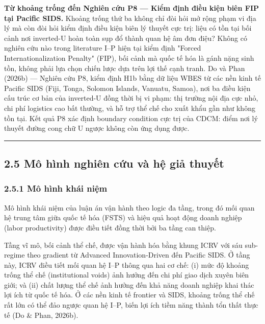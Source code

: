 \documentclass[12pt,a4paper]{article}
\begin{document}
\textbf{Từ khoảng trống đến Nghiên cứu P8 --- Kiểm định điều kiện biên
FIP tại Pacific SIDS.} Khoảng trống thứ ba không chỉ đòi hỏi mở rộng
phạm vi địa lý mà còn đòi hỏi kiểm định điều kiện biên lý thuyết cực
trị: liệu có tồn tại bối cảnh nơi inverted-U hoàn toàn sụp đổ thành quan
hệ âm đơn điệu? Không có nghiên cứu nào trong literature I--P hiện tại
kiểm định "Forced Internationalization Penalty" (FIP), bối cảnh mà quốc
tế hóa là gánh nặng sinh tồn, không phải lựa chọn chiến lược dựa trên
lợi thế cạnh tranh. Do và Phan (2026b) --- Nghiên cứu P8, kiểm định H1b
bằng dữ liệu WBES từ các nền kinh tế Pacific SIDS (Fiji, Tonga, Solomon
Islands, Vanuatu, Samoa), nơi ba điều kiện cấu trúc cơ bản của
inverted-U đồng thời bị vi phạm: thị trường nội địa cực nhỏ, chi phí
logistics cao bất thường, và hỗ trợ thể chế cho xuất khẩu gần như không
tồn tại. Kết quả P8 xác định boundary condition cực trị của CDCM: điểm
nơi lý thuyết đường cong chữ U ngược không còn ứng dụng được.

\begin{center}\rule{0.5\linewidth}{0.5pt}\end{center}

\hypertarget{25-muxf4-huxecnh-nghiuxean-cux1ee9u-vuxe0-hux1ec7-giux1ea3-thuyux1ebft}{%
\subsection{2.5 Mô hình nghiên cứu và hệ giả
thuyết}\label{25-muxf4-huxecnh-nghiuxean-cux1ee9u-vuxe0-hux1ec7-giux1ea3-thuyux1ebft}}

\hypertarget{251-muxf4-huxecnh-khuxe1i-niux1ec7m}{%
\subsubsection{2.5.1 Mô hình khái
niệm}\label{251-muxf4-huxecnh-khuxe1i-niux1ec7m}}

Mô hình khái niệm của luận án vận hành theo logic đa tầng, trong đó mối
quan hệ trung tâm giữa quốc tế hóa (FSTS) và hiệu quả hoạt động doanh
nghiệp (labor productivity) được điều tiết đồng thời bởi ba tầng can
thiệp.

Tầng vĩ mô, bối cảnh thể chế, được vận hành hóa bằng khung ICRV với sáu
sub-regime theo gradient từ Advanced Innovation-Driven đến Pacific SIDS.
Ở tầng này, ICRV điều tiết mối quan hệ I--P thông qua hai cơ chế: (i)
mức độ khoảng trống thể chế (institutional voids) ảnh hưởng đến chi phí
giao dịch xuyên biên giới; và (ii) chất lượng thể chế ảnh hưởng đến khả
năng doanh nghiệp khai thác lợi ích từ quốc tế hóa. Ở các nền kinh tế
frontier và SIDS, khoảng trống thể chế rất lớn có thể đảo ngược quan hệ
I--P, biến lợi ích tiềm năng thành tổn thất thực tế (Do \& Phan, 2026b).
\end{document}
